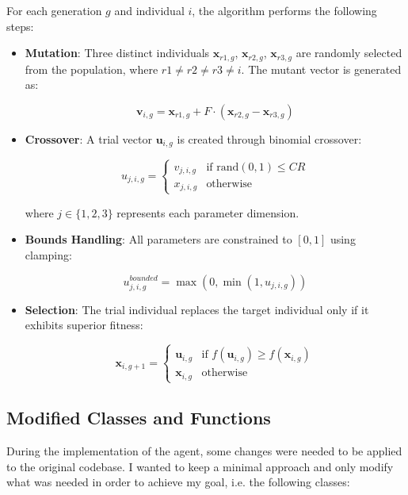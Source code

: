 \documentclass[sigconf]{acmart} %
\begin{document}
For each generation $g$ and individual $i$, the algorithm performs the following steps:\\
\begin{itemize}
    \item \textbf{Mutation}: Three distinct individuals $\mathbf{x}_{r1,g}$, $\mathbf{x}_{r2,g}$, $\mathbf{x}_{r3,g}$ are randomly selected from the population, where $r1 \neq r2 \neq r3 \neq i$. The mutant vector is generated as:

\begin{equation}
\mathbf{v}_{i,g} = \mathbf{x}_{r1,g} + F \cdot (\mathbf{x}_{r2,g} - \mathbf{x}_{r3,g})
\end{equation}
    \item \textbf{Crossover}:
A trial vector $\mathbf{u}_{i,g}$ is created through binomial crossover:

\begin{equation}
u_{j,i,g} = \begin{cases}
v_{j,i,g} & \text{if } \text{rand}(0,1) \leq CR \\
x_{j,i,g} & \text{otherwise}
\end{cases}
\end{equation}

where $j \in \{1,2,3\}$ represents each parameter dimension.
\item \textbf{Bounds Handling}:
All parameters are constrained to $[0,1]$ using clamping:

\begin{equation}
u_{j,i,g}^{bounded} = \max(0, \min(1, u_{j,i,g}))
\end{equation}
\item \textbf{Selection}:
The trial individual replaces the target individual only if it exhibits superior fitness:

\begin{equation}
\mathbf{x}_{i,g+1} = \begin{cases}
\mathbf{u}_{i,g} & \text{if } f(\mathbf{u}_{i,g}) \geq f(\mathbf{x}_{i,g}) \\
\mathbf{x}_{i,g} & \text{otherwise}
\end{cases}
\end{equation}
\end{itemize}
\subsection{Modified Classes and Functions}

During the implementation of the agent, some changes were needed to be applied to the original codebase. I wanted to keep a minimal approach and only modify what was needed in order to achieve my goal, i.e. the following classes:
\end{document}

